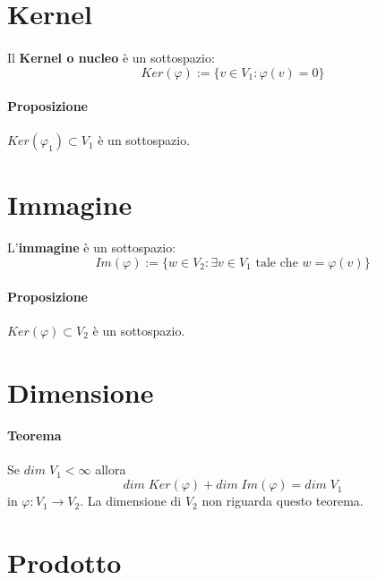 \documentclass[a4paper, 12pt]{report}
\begin{document}
        \section{Kernel}
            \paragraph{}Il \textbf{Kernel o nucleo} è un sottospazio:    
            $$Ker(\varphi):= \{v \in V_1 : \varphi(v)=0\}$$
            \paragraph{Proposizione}$Ker(\varphi_1) \subset V_1$ è un sottospazio.
        \section{Immagine}
            \paragraph{}L'\textbf{immagine} è un sottospazio:
            $$Im(\varphi):=\{w \in V_2: \exists v \in V_1 \text{ tale che }w=\varphi(v)\}$$
            \paragraph{Proposizione}$Ker(\varphi) \subset V_2$ è un sottospazio.
        \section{Dimensione}
            \paragraph{Teorema} Se $dim \; V_1<\infty$ allora
            $$dim \; Ker(\varphi)+dim \; Im(\varphi)=dim \; V_1$$
            in $\varphi:V_1\rightarrow V_2$. La dimensione di $V_2$ non riguarda questo teorema.
        \section{Prodotto}
\end{document}
